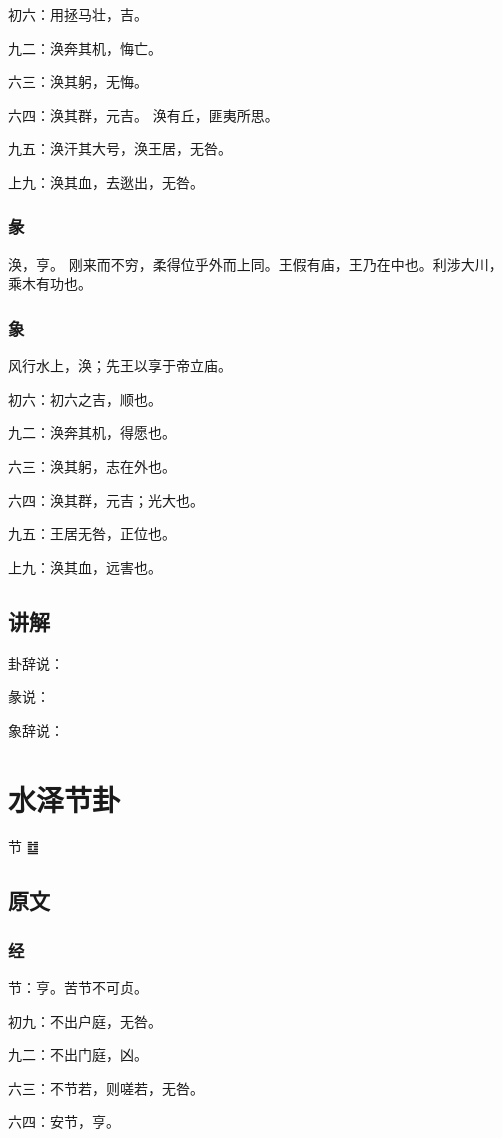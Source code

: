 \documentclass[12pt,oneside]{book}
\begin{document}
初六：用拯马壮，吉。

九二：涣奔其机，悔亡。

六三：涣其躬，无悔。

六四：涣其群，元吉。 涣有丘，匪夷所思。

九五：涣汗其大号，涣王居，无咎。

上九：涣其血，去逖出，无咎。

\subsection{彖}
涣，亨。 刚来而不穷，柔得位乎外而上同。王假有庙，王乃在中也。利涉大川，乘木有功也。

\subsection{象}
风行水上，涣；先王以享于帝立庙。

初六：初六之吉，顺也。

九二：涣奔其机，得愿也。

六三：涣其躬，志在外也。

六四：涣其群，元吉；光大也。

九五：王居无咎，正位也。

上九：涣其血，远害也。

\section{讲解}
卦辞说：

彖说：

象辞说：

\chapter{水泽节卦}
节 {\Large ䷻}


\section{原文}

\subsection{经}
节：亨。苦节不可贞。

初九：不出户庭，无咎。

九二：不出门庭，凶。

六三：不节若，则嗟若，无咎。

六四：安节，亨。
\end{document}
